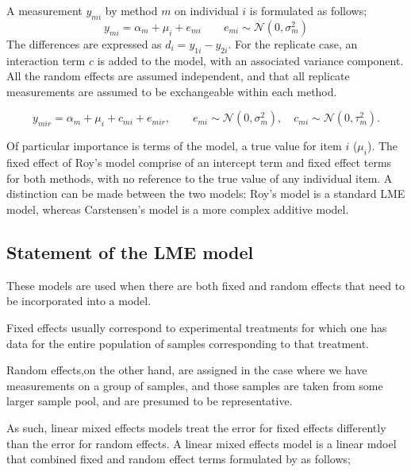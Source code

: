 \documentclass[12pt, a4paper]{report}
\theoremstyle{plain}
\theoremstyle{definition}
\theoremstyle{remark}
\begin{document}
A measurement $y_{mi}$ by method $m$ on individual $i$ is formulated as follows;
\begin{equation}
y_{mi}  = \alpha_{m} + \mu_{i} + e_{mi} \qquad  e_{mi} \sim
\mathcal{N}(0,\sigma^{2}_{m})
\end{equation}
The differences are expressed as $d_{i} = y_{1i} - y_{2i}$. For the replicate case, an interaction term $c$ is added to the model, with an associated variance component. All the random effects are assumed independent, and that all replicate measurements are assumed to be exchangeable within each method.

\begin{equation}
y_{mir}  = \alpha_{m} + \mu_{i} + c_{mi} + e_{mir}, \qquad  e_{mi}
\sim \mathcal{N}(0,\sigma^{2}_{m}), \quad c_{mi} \sim \mathcal{N}(0,\tau^{2}_{m}).
\end{equation}

Of particular importance is terms of the model, a true value for item $i$ ($\mu_{i}$).  The fixed effect of Roy's model comprise of an intercept term and fixed effect terms for both methods, with no reference to the true value of any individual item. A distinction can be made between the two models: Roy's model is a standard LME model, whereas Carstensen's model is a more complex additive model.







\subsection{Statement of the LME model}

	
	These models are used when there are both fixed and random effects that need to be incorporated into a model.
	
	Fixed effects usually correspond to experimental treatments for which one has data for the entire population of samples corresponding to that treatment.
	
	Random effects,on the other hand, are assigned in the case where we have measurements on a group of samples, and those
	samples are taken from some larger sample pool, and are presumed to be representative.
	
	As such, linear mixed effects models treat the error for fixed effects differently than the error for random effects.
A linear mixed effects model is a linear mdoel that combined fixed and random effect terms formulated by \citet{LW82} as follows;
\end{document}
